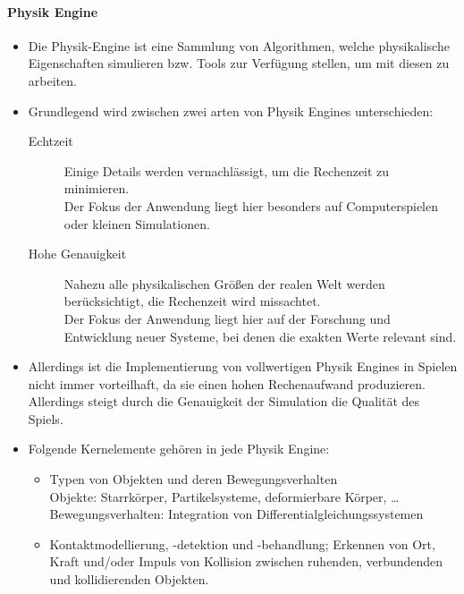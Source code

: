 \documentclass[a4paper, 11pt, accentcolor = tud3b]{tudreport}
\begin{document}
	        \paragraph{Physik Engine}
		        \begin{itemize}
		        	\item Die Physik-Engine ist eine Sammlung von Algorithmen, welche physikalische Eigenschaften simulieren bzw. Tools zur Verfügung stellen, um mit diesen zu arbeiten.
		        	\item Grundlegend wird zwischen zwei arten von Physik Engines unterschieden:
			        	\begin{description}
			        		\item[Echtzeit] Einige Details werden vernachlässigt, um die Rechenzeit zu minimieren. \\ Der Fokus der Anwendung liegt hier besonders auf Computerspielen oder kleinen Simulationen.
			        		\item[Hohe Genauigkeit] Nahezu alle physikalischen Größen der realen Welt werden berücksichtigt, die Rechenzeit wird missachtet. \\ Der Fokus der Anwendung liegt hier auf der Forschung und Entwicklung neuer Systeme, bei denen die exakten Werte relevant sind.
			        	\end{description}
		        	\item Allerdings ist die Implementierung von vollwertigen Physik Engines in Spielen nicht immer vorteilhaft, da sie einen hohen Rechenaufwand produzieren. Allerdings steigt durch die Genauigkeit der Simulation die Qualität des Spiels.
		        	\item Folgende Kernelemente gehören in jede Physik Engine:
			        	\begin{itemize}
			        		\item Typen von Objekten und deren Bewegungsverhalten \\
				        		Objekte: Starrkörper, Partikelsysteme, deformierbare Körper, \dots \\
				        		Bewegungsverhalten: Integration von Differentialgleichungssystemen
				        	\item Kontaktmodellierung, -detektion und -behandlung; Erkennen von Ort, Kraft und/oder Impuls von Kollision zwischen ruhenden, verbundenden und kollidierenden Objekten.
			        	\end{itemize}
		        \end{itemize}
\end{document}
